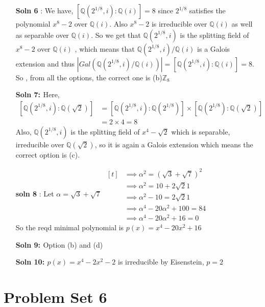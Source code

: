 \documentclass[12pt]{article}
\begin{document}
\begin{enumerate}
\begin{enumerate}
     \end{enumerate}
         \item[\bf{Soln 6}]: We have, $[\mathbb{Q}(2^{1/8},i):\mathbb{Q}(i)]=8$ since $2^{1/8}$ satisfies the polynomial $x^8 -2$ over $\mathbb{Q}(i)$. Also $x^8-2$ is irreducible over $\mathbb{Q}(i)$ as well as separable over $\mathbb{Q}(i)$. So we get that $\mathbb{Q}(2^{1/8},i)$ is the splitting field of $x^8-2$ over $\mathbb{Q}(i)$ , which means that $\mathbb{Q}(2^{1/8},i)/\mathbb{Q}(i)$ is a Galois extension and thus  $|Gal(\mathbb{Q}(2^{1/8},i)/\mathbb{Q}(i))|=[\mathbb{Q}(2^{1/8},i):\mathbb{Q}(i)]=8$. So , from all the options, the correct one is (b)$\mathbb{Z}_8$
         \item[\bf{Soln 7: }] Here, \[
         \begin{aligned}
             [\mathbb{Q}(2^{1/8},i):\mathbb{Q}(\sqrt2)]&=[\mathbb{Q}(2^{1/8},i):\mathbb{Q}(2^{1/8})]\times [\mathbb{Q}(2^{1/8}):\mathbb{Q}(\sqrt2)]\\
             &=2\times4=8
         \end{aligned}
         \] 
         Also, $\mathbb{Q}(2^{1/8},i)$ is the splitting field of $x^4-\sqrt2$ which is separable, irreducible over $\mathbb{Q}(\sqrt2)$, so it is again a Galois extension which means the correct option is (c).
        \item[\bf{soln 8}]: Let $\alpha=\sqrt3+\sqrt7$
    $\begin{aligned}[t]
        &\implies \alpha^2=(\sqrt3+\sqrt7)^2\\
        &\implies \alpha^2=10+2\sqrt21\\ 
        &\implies \alpha^2-10=2\sqrt21\\
        &\implies \alpha^4-20\alpha^2+100=84\\
        &\implies \alpha^4-20\alpha^2+16=0
    \end{aligned}$\\
    So the reqd minimal polynomial is $p(x)=x^4-20x^2+16$
     \item[\bf{Soln 9: }] Option (b) and (d)
    \item[\bf{Soln 10: }] $p(x)=x^4-2x^2-2$ is irreducible by Eisenstein, $p=2$ 
\end{enumerate}

\section{Problem Set 6}
\end{document}
